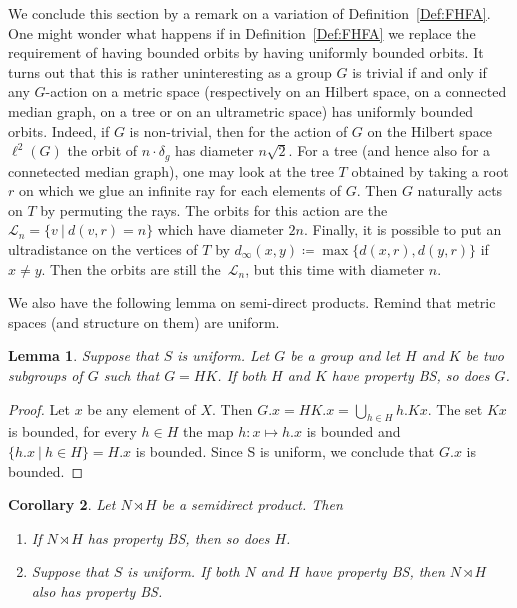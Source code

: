 \documentclass[a4paper]{article}
\newtheorem{lem}{Lemma}[section]
\newtheorem{cor}[lem]{Corollary}
\theoremstyle{definition}
\newcommand{\setst}[2]{\{#1\ |\ #2\}}
\begin{document}
We conclude this section by a remark on a variation of Definition~\ref{Def:FHFA}.
One might wonder what happens if in Definition~\ref{Def:FHFA} we replace the requirement of having bounded orbits by having uniformly bounded orbits.
It turns out that this is rather uninteresting as a group $G$ is trivial if and only if any $G$-action on a metric space (respectively on an Hilbert space, on a connected median graph, on a tree or on an ultrametric space) has uniformly bounded orbits.
Indeed, if $G$ is non-trivial, then for the action of $G$ on the Hilbert space $\ell^2(G)$ the orbit of $n\cdot \delta_g$ has diameter $n\sqrt2$.
For a tree (and hence also for a connetected median graph), one may look at the tree $T$ obtained by taking a root $r$ on which we glue an infinite ray for each elements of $G$. Then $G$ naturally acts on $T$ by permuting the rays. The orbits for this action are the $\mathcal L_n=\setst{v}{d(v,r)=n}$ which have diameter $2n$.
Finally, it is possible to put an ultradistance on the vertices of $T$ by  $d_\infty(x,y)\coloneqq\max\{d(x,r),d(y,r)\}$ if $x\neq y$. Then the orbits are still the~$\mathcal L_n$, but this time with diameter $n$.


We also have the following lemma on semi-direct products.
Remind that metric spaces (and structure on them) are uniform.
%
%
\begin{lem}
Suppose that $S$ is uniform.
Let $G$ be a group and let $H$ and $K$ be two subgroups of $G$ such that $G=HK$.
If both $H$ and $K$ have property BS, so does $G$.
\end{lem}
\begin{proof}
Let $x$ be any element of $X$.
Then $G.x=HK.x=\bigcup_{h\in H}h.Kx$.
The set $Kx$ is bounded, for every $h\in H$ the map $h\colon x\mapsto h.x$ is bounded and $\setst{h.x}{h\in H}=H.x$ is bounded. Since S is uniform, we conclude that $G.x$ is bounded.
\end{proof}
%
%
%
%
\begin{cor}
Let $N\rtimes H$ be a semidirect product. Then
\begin{enumerate}
\item
If $N\rtimes H$ has property BS, then so does $H$.
\item
Suppose that $S$ is uniform.
If both $N$ and $H$ have property BS, then $N\rtimes H$ also has property BS.
\end{enumerate}
\end{cor}
\end{document}
